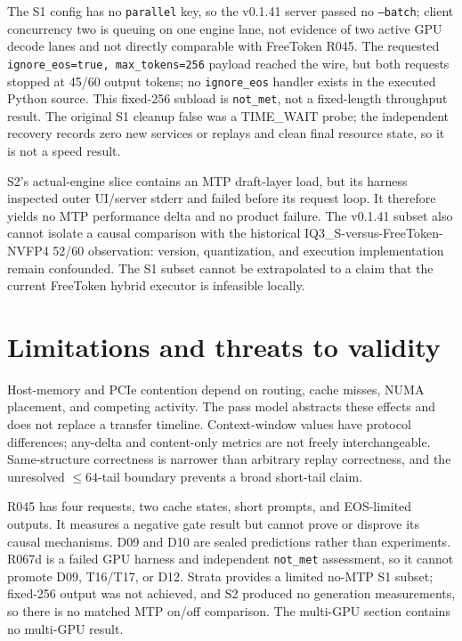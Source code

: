 \documentclass[11pt]{article}
\begin{document}
The S1 config has no \texttt{parallel} key, so the v0.1.41 server passed no \texttt{--batch}; client concurrency two is queuing on one engine lane, not evidence of two active GPU decode lanes and not directly comparable with FreeToken R045. The requested \texttt{ignore\_eos=true, max\_tokens=256} payload reached the wire, but both requests stopped at 45/60 output tokens; no \texttt{ignore\_eos} handler exists in the executed Python source. This fixed-256 subload is \texttt{not\_met}, not a fixed-length throughput result. The original S1 cleanup false was a TIME\_WAIT probe; the independent recovery records zero new services or replays and clean final resource state, so it is not a speed result.

S2's actual-engine slice contains an MTP draft-layer load, but its harness inspected outer UI/server stderr and failed before its request loop. It therefore yields no MTP performance delta and no product failure. The v0.1.41 subset also cannot isolate a causal comparison with the historical IQ3\_S-versus-FreeToken-NVFP4 52/60 observation: version, quantization, and execution implementation remain confounded. The S1 subset cannot be extrapolated to a claim that the current FreeToken hybrid executor is infeasible locally.

\section{Limitations and threats to validity}

Host-memory and PCIe contention depend on routing, cache misses, NUMA placement, and competing activity. The pass model abstracts these effects and does not replace a transfer timeline. Context-window values have protocol differences; any-delta and content-only metrics are not freely interchangeable. Same-structure correctness is narrower than arbitrary replay correctness, and the unresolved $\leq64$-tail boundary prevents a broad short-tail claim.

R045 has four requests, two cache states, short prompts, and EOS-limited outputs. It measures a negative gate result but cannot prove or disprove its causal mechanisms. D09 and D10 are sealed predictions rather than experiments. R067d is a failed GPU harness and independent \texttt{not\_met} assessment, so it cannot promote D09, T16/T17, or D12. Strata provides a limited no-MTP S1 subset; fixed-256 output was not achieved, and S2 produced no generation measurements, so there is no matched MTP on/off comparison. The multi-GPU section contains no multi-GPU result.
\end{document}
